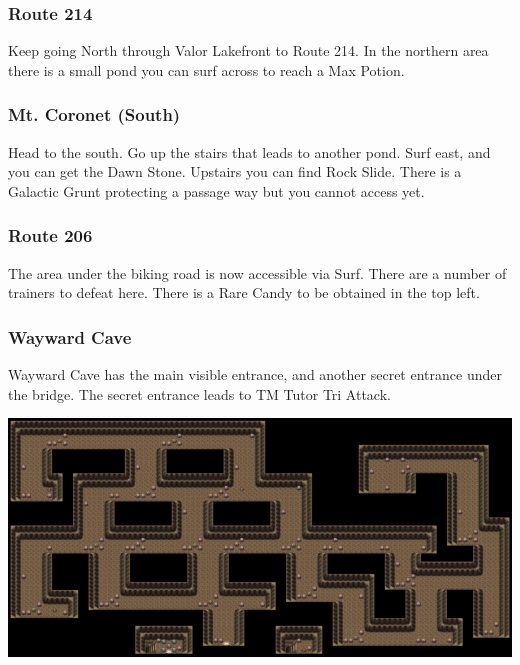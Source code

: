 \documentclass[11pt]{article}
\begin{document}
\subsubsection{Route 214}
Keep going North through Valor Lakefront to Route 214.
In the northern area there is a small pond you can surf across to reach
a Max Potion.

\subsubsection{Mt. Coronet (South)}
Head to the south.
Go up the stairs that leads to another pond.
Surf east, and you can get the Dawn Stone.
Upstairs you can find Rock Slide.
There is a Galactic Grunt protecting a passage way but you cannot access yet.



\subsubsection{Route 206}
The area under the biking road is now accessible via Surf.
There are a number of trainers to defeat here.
There is a Rare Candy to be obtained in the top left.




\subsubsection{Wayward Cave}

Wayward Cave has the main visible entrance, and another secret entrance under
the bridge.
The secret entrance leads to TM Tutor Tri Attack.

\includegraphics[width=\textwidth]{walkthrough/Sinnoh/wayward-cave}


\end{document}
